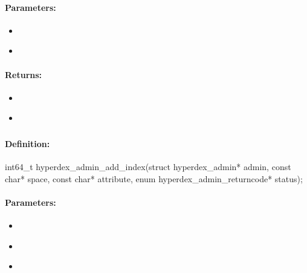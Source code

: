 \paragraph{Parameters:}
\begin{itemize}[noitemsep]
\item {}\\

\item {}\\

\end{itemize}

\paragraph{Returns:}
\begin{itemize}[noitemsep]
\item {}\\

\item {}\\

\end{itemize}

\pagebreak
\subsubsection{}
\label{api:c:add_index}


\paragraph{Definition:}
\begin{ccode}
int64_t hyperdex_admin_add_index(struct hyperdex_admin* admin,
        const char* space,
        const char* attribute,
        enum hyperdex_admin_returncode* status);
\end{ccode}

\paragraph{Parameters:}
\begin{itemize}[noitemsep]
\item {}\\

\item {}\\

\item {}\\

\end{itemize}

